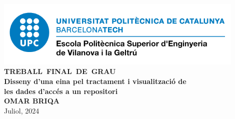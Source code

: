 \begin{titlepage}
    \begin{center}

        \vspace*{-3cm}
        \includegraphics[width=0.9\textwidth]{figures/epsevg-logo} \\ [1cm]

        \Huge
        \vspace{1cm}
        \textbf{\mbox{TREBALL FINAL DE GRAU}} \\ [3cm]

        \Huge
        \textbf{Disseny d'una eina pel tractament i visualització de \\ les dades d'accés a un repositori} \\ [2cm]

        \huge
        \textbf{OMAR BRIQA} \\ [3cm]
        Juliol, 2024

    \end{center}
\end{titlepage}
